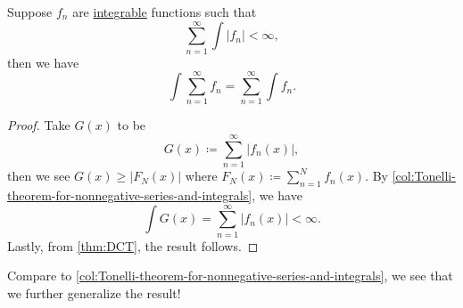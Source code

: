 \begin{corollary}\label{col:Tonelli-theorem-for-series-and-integrals}
	Suppose \(f_{n}\) are \hyperref[def:integrable]{integrable} functions such that
	\[
		\sum_{n=1}^{\infty} \int \left\vert f_{n} \right\vert < \infty,
	\]
	then we have
	\[
		\int \sum_{n=1}^{\infty} f_{n} = \sum_{n=1}^{\infty} \int f_{n}.
	\]
\end{corollary}
\begin{proof}
	Take \(G(x)\) to be
	\[
		G(x) \coloneqq \sum_{n=1}^{\infty} \left\vert f_{n}(x) \right\vert,
	\]
	then we see \(G(x) \geq \left\vert F_{N}(x) \right\vert\) where \(F_{N}(x) \coloneqq \sum_{n=1}^{N} f_{n}(x)\).
	By \autoref{col:Tonelli-theorem-for-nonnegative-series-and-integrals}, we have
	\[
		\int G(x) = \sum_{n=1}^{\infty} \left\vert f_{n}(x) \right\vert < \infty .
	\]
	Lastly, from \autoref{thm:DCT}, the result follows.
\end{proof}
\begin{remark}
	Compare to \autoref{col:Tonelli-theorem-for-nonnegative-series-and-integrals}, we see that we further generalize the result!
\end{remark}